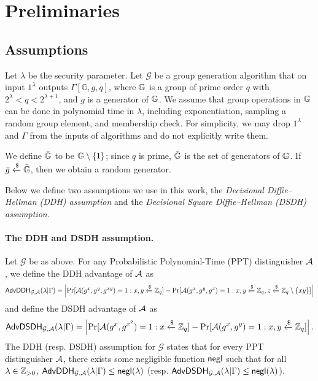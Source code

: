 \section{Preliminaries}

\subsection{Assumptions}

Let $\lambda$ be the security parameter. Let $\mathcal{G}$ be a group generation algorithm that on input $1^\lambda$ outputs $\Gamma[\mathbb{G}, g, q]$, where $\mathbb{G}$ is a group of prime order $q$ with $2^\lambda < q < 2^{\lambda+1}$, and $g$ is a generator of $\mathbb{G}$. We assume that group operations in $\mathbb{G}$ can be done in polynomial time in $\lambda$, including exponentiation, sampling a random group element, and membership check. For simplicity, we may drop $1^\lambda$ and $\Gamma$ from the inputs of algorithms and do not explicitly write them.

We define $\bar{\mathbb{G}}$ to be $\mathbb{G}\setminus\{1\}$; since $q$ is prime, $\bar{\mathbb{G}}$ is the set of generators of $\mathbb{G}$. If $\bar{g}\xleftarrow{\$}\bar{\mathbb{G}}$, then we obtain a random generator.

Below we define two assumptions we use in this work, the \emph{Decisional Diffie--Hellman (DDH) assumption} and the \emph{Decisional Square Diffie--Hellman (DSDH) assumption}.

\paragraph{The DDH and DSDH assumption.}
Let $\mathcal{G}$ be as above. For any Probabilistic Polynomial-Time (PPT) distinguisher $\mathcal{A}$, we define the DDH advantage of $\mathcal{A}$ as
\begin{equation*}
	\mathsf{AdvDDH}_{\mathcal{G},\mathcal{A}}(\lambda | \Gamma) = \left|\Pr[\mathcal{A}(g^x,g^y,g^{xy}) = 1 : x,y\xleftarrow{\$}\mathbb{Z}_q] - \Pr[\mathcal{A}(g^x,g^y,g^z) = 1 : x,y\xleftarrow{\$}\mathbb{Z}_q, z\xleftarrow{\$}\mathbb{Z}_q\setminus\{xy\}]\right|
\end{equation*}
and define the DSDH advantage of $\mathcal{A}$ as
\begin{equation*}
	\mathsf{AdvDSDH}_{\mathcal{G},\mathcal{A}}(\lambda | \Gamma) = \left|\Pr[\mathcal{A}(g^x,g^{x^2}) = 1 : x\xleftarrow{\$}\mathbb{Z}_q] - \Pr[\mathcal{A}(g^x,g^y) = 1 : x,y\xleftarrow{\$}\mathbb{Z}_q]\right|.
\end{equation*}
The DDH (resp. DSDH) assumption for $\mathcal{G}$ states that for every PPT distinguisher $\mathcal{A}$, there exists some negligible function $\mathsf{negl}$ such that for all $\lambda\in\mathbb{Z}_{> 0}$, $\mathsf{AdvDDH}_{\mathcal{G},\mathcal{A}}(\lambda | \Gamma)\leq\mathsf{negl}(\lambda)$ (resp. $\mathsf{AdvDSDH}_{\mathcal{G},\mathcal{A}}(\lambda | \Gamma)\leq\mathsf{negl}(\lambda)$).

